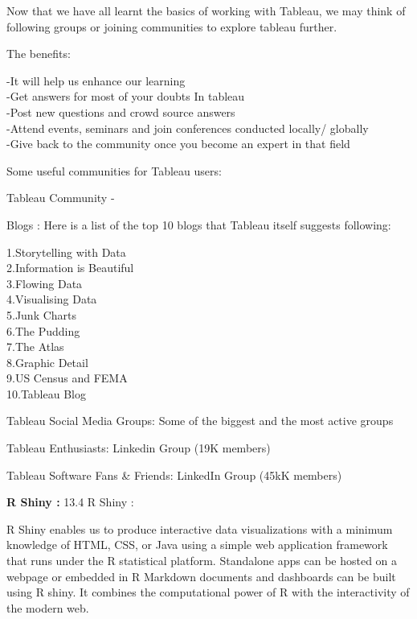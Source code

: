 \documentclass[]{book}
\theoremstyle{definition}
\theoremstyle{definition}
\theoremstyle{definition}
\theoremstyle{remark}
\begin{document}
\citep{tableau_interactive_viz}

Now that we have all learnt the basics of working with Tableau, we may
think of following groups or joining communities to explore tableau
further.

The benefits:

-It will help us enhance our learning\\
-Get answers for most of your doubts In tableau\\
-Post new questions and crowd source answers\\
-Attend events, seminars and join conferences conducted locally/
globally\\
-Give back to the community once you become an expert in that field

Some useful communities for Tableau users:

Tableau Community - \citep{Tableau_Community}

Blogs : Here is a list of the top 10 blogs that Tableau itself suggests
following:\\
\citep{Top_10_Blogs}

1.Storytelling with Data\\
2.Information is Beautiful\\
3.Flowing Data\\
4.Visualising Data\\
5.Junk Charts\\
6.The Pudding\\
7.The Atlas\\
8.Graphic Detail\\
9.US Census and FEMA\\
10.Tableau Blog

Tableau Social Media Groups: Some of the biggest and the most active
groups

Tableau Enthusiasts: Linkedin Group (19K members)

Tableau Software Fans \& Friends: LinkedIn Group (45kK members)

\citep{LinkedIn_Groups}

\textbf{R Shiny :} 13.4 R Shiny :

R Shiny enables us to produce interactive data visualizations with a
minimum knowledge of HTML, CSS, or Java using a simple web application
framework that runs under the R statistical platform. Standalone apps
can be hosted on a webpage or embedded in R Markdown documents and
dashboards can be built using R shiny. It combines the computational
power of R with the interactivity of the modern web.
\end{document}
